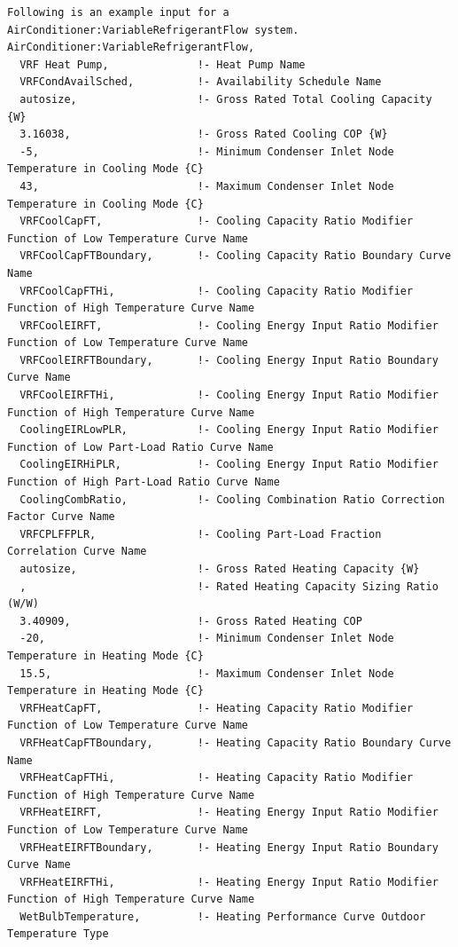 \begin{lstlisting}
Following is an example input for a AirConditioner:VariableRefrigerantFlow system.
AirConditioner:VariableRefrigerantFlow,
  VRF Heat Pump,              !- Heat Pump Name
  VRFCondAvailSched,          !- Availability Schedule Name
  autosize,                   !- Gross Rated Total Cooling Capacity {W}
  3.16038,                    !- Gross Rated Cooling COP {W}
  -5,                         !- Minimum Condenser Inlet Node Temperature in Cooling Mode {C}
  43,                         !- Maximum Condenser Inlet Node Temperature in Cooling Mode {C}
  VRFCoolCapFT,               !- Cooling Capacity Ratio Modifier Function of Low Temperature Curve Name
  VRFCoolCapFTBoundary,       !- Cooling Capacity Ratio Boundary Curve Name
  VRFCoolCapFTHi,             !- Cooling Capacity Ratio Modifier Function of High Temperature Curve Name
  VRFCoolEIRFT,               !- Cooling Energy Input Ratio Modifier Function of Low Temperature Curve Name
  VRFCoolEIRFTBoundary,       !- Cooling Energy Input Ratio Boundary Curve Name
  VRFCoolEIRFTHi,             !- Cooling Energy Input Ratio Modifier Function of High Temperature Curve Name
  CoolingEIRLowPLR,           !- Cooling Energy Input Ratio Modifier Function of Low Part-Load Ratio Curve Name
  CoolingEIRHiPLR,            !- Cooling Energy Input Ratio Modifier Function of High Part-Load Ratio Curve Name
  CoolingCombRatio,           !- Cooling Combination Ratio Correction Factor Curve Name
  VRFCPLFFPLR,                !- Cooling Part-Load Fraction Correlation Curve Name
  autosize,                   !- Gross Rated Heating Capacity {W}
  ,                           !- Rated Heating Capacity Sizing Ratio (W/W)
  3.40909,                    !- Gross Rated Heating COP
  -20,                        !- Minimum Condenser Inlet Node Temperature in Heating Mode {C}
  15.5,                       !- Maximum Condenser Inlet Node Temperature in Heating Mode {C}
  VRFHeatCapFT,               !- Heating Capacity Ratio Modifier Function of Low Temperature Curve Name
  VRFHeatCapFTBoundary,       !- Heating Capacity Ratio Boundary Curve Name
  VRFHeatCapFTHi,             !- Heating Capacity Ratio Modifier Function of High Temperature Curve Name
  VRFHeatEIRFT,               !- Heating Energy Input Ratio Modifier Function of Low Temperature Curve Name
  VRFHeatEIRFTBoundary,       !- Heating Energy Input Ratio Boundary Curve Name
  VRFHeatEIRFTHi,             !- Heating Energy Input Ratio Modifier Function of High Temperature Curve Name
  WetBulbTemperature,         !- Heating Performance Curve Outdoor Temperature Type

\end{lstlisting}
